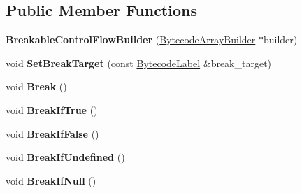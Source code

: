\subsection*{Public Member Functions}
\begin{DoxyCompactItemize}
\item 
{\bfseries Breakable\+Control\+Flow\+Builder} (\hyperlink{classv8_1_1internal_1_1interpreter_1_1_bytecode_array_builder}{Bytecode\+Array\+Builder} $\ast$builder)\hypertarget{classv8_1_1internal_1_1interpreter_1_1_breakable_control_flow_builder_a4f34bcbfde56230b7fa3d9d5ca1cc647}{}\label{classv8_1_1internal_1_1interpreter_1_1_breakable_control_flow_builder_a4f34bcbfde56230b7fa3d9d5ca1cc647}

\item 
void {\bfseries Set\+Break\+Target} (const \hyperlink{classv8_1_1internal_1_1interpreter_1_1_bytecode_label}{Bytecode\+Label} \&break\+\_\+target)\hypertarget{classv8_1_1internal_1_1interpreter_1_1_breakable_control_flow_builder_a5803c12ce727b92924a0b7fb834a7489}{}\label{classv8_1_1internal_1_1interpreter_1_1_breakable_control_flow_builder_a5803c12ce727b92924a0b7fb834a7489}

\item 
void {\bfseries Break} ()\hypertarget{classv8_1_1internal_1_1interpreter_1_1_breakable_control_flow_builder_ace27cb19fc5e5324faed5df2d7f82cd6}{}\label{classv8_1_1internal_1_1interpreter_1_1_breakable_control_flow_builder_ace27cb19fc5e5324faed5df2d7f82cd6}

\item 
void {\bfseries Break\+If\+True} ()\hypertarget{classv8_1_1internal_1_1interpreter_1_1_breakable_control_flow_builder_a77ad1f2cf320eb783db68b30082b45d3}{}\label{classv8_1_1internal_1_1interpreter_1_1_breakable_control_flow_builder_a77ad1f2cf320eb783db68b30082b45d3}

\item 
void {\bfseries Break\+If\+False} ()\hypertarget{classv8_1_1internal_1_1interpreter_1_1_breakable_control_flow_builder_af028b914543bc445c1027abc60e0fdae}{}\label{classv8_1_1internal_1_1interpreter_1_1_breakable_control_flow_builder_af028b914543bc445c1027abc60e0fdae}

\item 
void {\bfseries Break\+If\+Undefined} ()\hypertarget{classv8_1_1internal_1_1interpreter_1_1_breakable_control_flow_builder_a6b2505084ac90c72908f416b23bff6b4}{}\label{classv8_1_1internal_1_1interpreter_1_1_breakable_control_flow_builder_a6b2505084ac90c72908f416b23bff6b4}

\item 
void {\bfseries Break\+If\+Null} ()\hypertarget{classv8_1_1internal_1_1interpreter_1_1_breakable_control_flow_builder_a84be8f1a74d6fea4681b20d50ceed260}{}\label{classv8_1_1internal_1_1interpreter_1_1_breakable_control_flow_builder_a84be8f1a74d6fea4681b20d50ceed260}

\end{DoxyCompactItemize}

